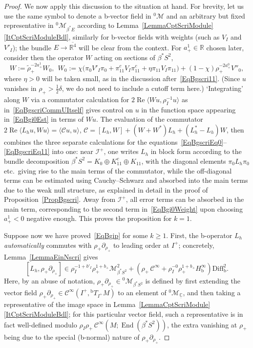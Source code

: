 \documentclass[reqno,11pt,letterpaper]{amsart}
\numberwithin{equation}{section}
\numberwithin{figure}{section}
\theoremstyle{definition}
\theoremstyle{remark}
\newcommand{\mc}{\mathcal}
\newcommand{\cC}{\mc C}
\newcommand{\cM}{\mc M}
\newcommand{\ms}{\mathscr}
\newcommand{\scri}{\ms I}
\newcommand{\C}{\mathbb{C}}
\newcommand{\R}{\mathbb{R}}
\newcommand{\End}{\operatorname{End}}
\renewcommand{\Re}{\operatorname{Re}}
\newcommand{\la}{\langle}
\newcommand{\ol}{\overline}
\newcommand{\pa}{\partial}
\newcommand{\ra}{\rangle}
\newcommand{\ul}[1]{\underline{#1}{}}
\newcommand{\wt}{\widetilde}
\newcommand{\bop}{{\mathrm{b}}}
\newcommand{\Diff}{\mathrm{Diff}}
\newcommand{\Diffb}{\Diff_\bop}
\newcommand{\Tb}{{}^{\bop}T}
\newcommand{\half}{\tfrac{1}{2}}
\newcommand{\CI}{\cC^\infty}
\newcommand{\Hb}{H_{\bop}}
\begin{document}
\begin{proof}
  We now apply this discussion to the situation at hand. For brevity, let us use the same symbol to denote a b-vector field in ${}^0\cM$ and an arbitrary but fixed representative in ${}^0\cM_{\beta^*E}$ according to Lemma~\ref{LemmaCptScriModule}\eqref{ItCptScriModuleBdl}, similarly for b-vector fields with weights (such as $V_I$ and $V'_I$); the bundle $E\to\ol{\R^4}$ will be clear from the context. For $a^1_+\in\R$ chosen later, consider then the operator $W$ acting on sections of $\beta^*S^2$,
  \begin{equation}
  \label{EqBgipCommutant}
    W:=\wt\rho_+^{-2 a_+^1}W_0,\ \ W_0:=\chi\bigl(\pi_0 V'_I\pi_0 + \pi_{1 1}^c V_I\pi_{1 1}^c + \eta \pi_{1 1} V_I\pi_{1 1}\bigr) + (1-\chi)\rho_+^{-2 a_+^0}V''_0,
  \end{equation}
  where $\eta>0$ will be taken small, as in the discussion after~\eqref{EqBgscri11}. (Since $u$ vanishes in $\rho_+>\half\delta$, we do not need to include a cutoff term here.) `Integrating' along $W$ via a commutator calculation for $2\Re\la W u,\rho_I^{-1} u\ra$ as in~\eqref{EqBgscriCommUItself} gives control on $u$ in the function space appearing in~\eqref{EqBgi0Est} in terms of $W u$. The evaluation of the commutator $2\Re\la L_h u, W u\ra=\la\cC u,u\ra$, $\cC=[L_h,W]+(W+W^*)L_h+(L_h^*-L_h)W$, then combines the three separate calculations for the equations~\eqref{EqBgscriEq0}--\eqref{EqBgscriEq11} into one: near $\scri^+$, one writes $L_h$ in block form according to the bundle decomposition $\beta^*S^2=K_0\oplus K_{1 1}^c\oplus K_{1 1}$, with the diagonal elements $\pi_0 L_h\pi_0$ etc.\ giving rise to the main terms of the commutator, while the off-diagonal terms can be estimated using Cauchy--Schwarz and absorbed into the main terms due to the weak null structure, as explained in detail in the proof of Proposition~\ref{PropBgscri}. Away from $\scri^+$, all error terms can be absorbed in the main term, corresponding to the second term in~\eqref{EqBgi0Weight} upon choosing $a_+^1<0$ negative enough. This proves the proposition for $k=1$.

  Suppose now we have proved~\eqref{EqBgip} for some $k\geq 1$. First, the b-operator $L_h$ \emph{automatically} commutes with $\rho_+\pa_{\rho_+}$ to leading order at $I^+$; concretely, Lemma~\ref{LemmaEinNscri} gives
  \[
    [L_h,\rho_+\pa_{\rho_+}] \in \rho_I^{-1+b'_I}\rho_+^{1+b_+}\cM_{\beta^*S^2}^2 + (\rho_+\,\CI+\rho_I^{-0}\rho_+^{1+b_+}\Hb^\infty)\Diffb^2.
  \]
  Here, by an abuse of notation, $\rho_+\pa_{\rho_+}\in {}^0\cM_{\beta^*S^2}$ is defined by first extending the vector field $\rho_+\pa_{\rho_+}\in\CI(I^+,\Tb_{I^+}M)$ to an element of ${}^0\cM_{\ul\C}$, and then taking a representative of the image space in Lemma~\ref{LemmaCptScriModule}\eqref{ItCptScriModuleBdl}; for this particular vector field, such a representative is in fact well-defined modulo $\rho_I\rho_+\,\CI(M;\End(\beta^*S^2))$, the extra vanishing at $\rho_+$ being due to the special (b-normal) nature of $\rho_+\pa_{\rho_+}$.


\end{proof}
\end{document}
